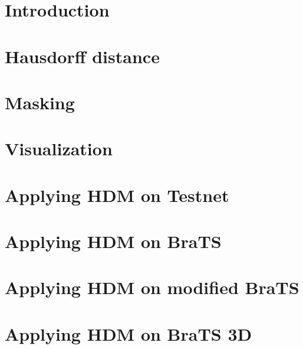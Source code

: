 \section{Introduction}
\section{Hausdorff distance}
\section{Masking}
\section{Visualization}
\section{Applying HDM on Testnet}
\section{Applying HDM on BraTS}
\section{Applying HDM on modified BraTS}
\section{Applying HDM on BraTS 3D}
